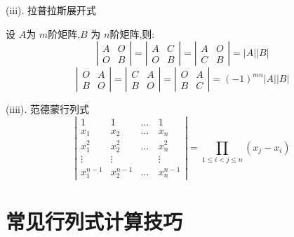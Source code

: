 \begin{definition}
	(iii). 拉普拉斯展开式
	
	设 $A$为 $m$阶矩阵,$B$ 为 $n$阶矩阵,则:  
	$$\left| 
	\begin{matrix}
		A&O\\
		O&B
	\end{matrix}\right| =\left| 
	\begin{matrix}
		A&C\\
		O&B
	\end{matrix}\right|=\left| 
	\begin{matrix}
		A&O\\
		C&B
	\end{matrix}\right|=|A||B|$$
	$$\left| 
	\begin{matrix}
		O&A\\
		B&O
	\end{matrix}\right| =\left| 
	\begin{matrix}
		C&A\\
		B&O
	\end{matrix}\right|=\left| 
	\begin{matrix}
		O&A\\
		B&C
	\end{matrix}\right|=(-1)^{mn}|A||B|$$
	
	(iiii). 范德蒙行列式
	$$\left|\begin{matrix}
		1&1&\dots&1\\
		x_{1}&x_{2}&\dots&x_{n}\\
		x_{1}^{2}&x_{2}^{2}&\dots&x_{n}^{2}\\
		\vdots&\vdots&\quad &\vdots\\
		x_{1}^{n-1}&x_{2}^{n-1}&\dots&x_{n}^{n-1}
	\end{matrix} \right|=\prod\limits_{1\leq i<j\leq n}(x_{j}-x_{i})$$
\end{definition}
\section{常见行列式计算技巧}

